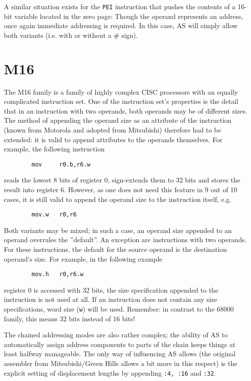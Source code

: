 \documentclass[12pt,twoside]{report}
\newcommand{\tty}[1]{{\tt #1}}
\begin{document}
A similar situation exists for the \tty{PEI} instruction that pushes the
contents of a 16-bit variable located in the zero page: Though the operand
represents an address, once again immediate addressing is required.  In
this case, AS will simply allow both variants (i.e. with or without a \#
sign).


\section{M16}

The M16 family is a family of highly complex CISC processors with an
equally complicated instruction set.  One of the instruction set's
properties is the detail that in an instruction with two operands,
both operands may be of different sizes.  The method of appending the
operand size as an attribute of the instruction (known from Motorola
and adopted from Mitsubishi) therefore had to be extended: it is
valid to append attributes to the operands themselves.  For example,
the following instruction
\begin{verbatim}
        mov     r0.b,r6.w
\end{verbatim}
reads the lowest 8 bits of register 0, sign-extends them to 32 bits
and stores the result into register 6.  However, as one does not need
this feature in 9 out of 10 cases, it is still valid to append the
operand size to the instruction itself, e.g.
\begin{verbatim}
        mov.w   r0,r6
\end{verbatim}
Both variants may be mixed; in such a case, an operand size appended
to an operand overrules the ''default''.  An exception are instructions
with two operands.  For these instructions, the default for the
source operand is the destination operand's size.  For example, in
the following example
\begin{verbatim}
        mov.h   r0,r6.w
\end{verbatim}
register 0 is accessed with 32 bits, the size specification appended
to the instruction is not used at all.  If an instruction does not
contain any size specifications, word size (\tty{w}) will be used. 
Remember: in contrast to the 68000 family, this means 32 bits instead
of 16 bits!

The chained addressing modes are also rather complex; the ability of
AS to automatically assign address components to parts of the chain
keeps things at least halfway manageable.  The only way of influencing
AS allows (the original assembler from Mitsubishi/Green Hills allows
a bit more in this respect) is the explicit setting of displacement
lengths by appending \tty{:4, :16} and \tty{:32}.
\end{document}
